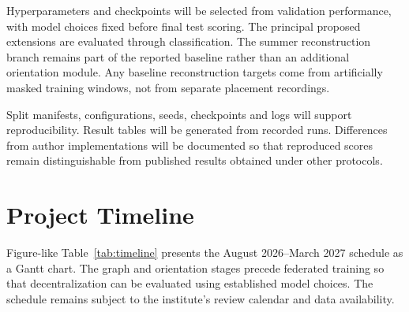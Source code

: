 \documentclass[10pt,a4paper,oneside,openany]{report}
\begin{document}
Hyperparameters and checkpoints will be selected from validation performance, with model choices fixed before final test scoring. The principal proposed extensions are evaluated through classification. The summer reconstruction branch remains part of the reported baseline rather than an additional orientation module. Any baseline reconstruction targets come from artificially masked training windows, not from separate placement recordings.

Split manifests, configurations, seeds, checkpoints and logs will support reproducibility. Result tables will be generated from recorded runs. Differences from author implementations will be documented so that reproduced scores remain distinguishable from published results obtained under other protocols.

\section{Project Timeline}

Figure-like Table~\ref{tab:timeline} presents the August 2026--March 2027 schedule as a Gantt chart. The graph and orientation stages precede federated training so that decentralization can be evaluated using established model choices. The schedule remains subject to the institute's review calendar and data availability.
\end{document}
